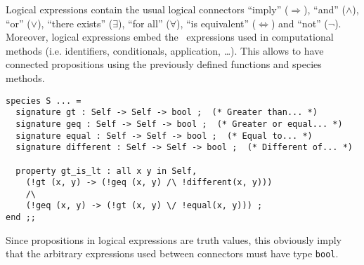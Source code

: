 
 Logical expressions contain the usual logical connectors ``imply''
($\Rightarrow$), ``and'' ($\wedge$), ``or'' ($\vee$), ``there exists''
($\exists$), ``for all'' ($\forall$), ``is equivalent''
($\Leftrightarrow$) and ``not'' ($\neg$). Moreover, logical
expressions embed the \focal\ expressions used in computational
methods (i.e. identifiers, conditionals, application, \ldots). This
allows to have connected propositions using the previously defined
functions and species methods.
{\scriptsize
\begin{lstlisting}
species S ... =
  signature gt : Self -> Self -> bool ;  (* Greater than... *)
  signature geq : Self -> Self -> bool ;  (* Greater or equal... *)
  signature equal : Self -> Self -> bool ;  (* Equal to... *)
  signature different : Self -> Self -> bool ;  (* Different of... *)

  property gt_is_lt : all x y in Self,
    (!gt (x, y) -> (!geq (x, y) /\ !different(x, y)))
    /\
    (!geq (x, y) -> (!gt (x, y) \/ !equal(x, y))) ;
end ;;
\end{lstlisting}
}
Since  propositions in logical expressions are truth values, this
obviously imply that the arbitrary expressions used between connectors
must have type {\tt bool}.



